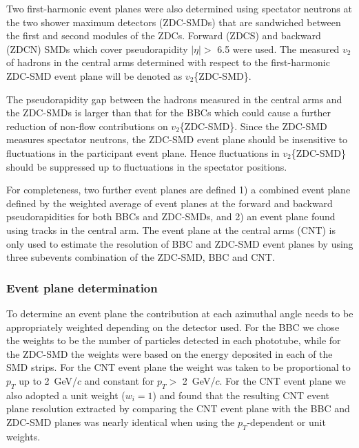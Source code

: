 \documentclass[aps,prc,superscriptaddress,showpacs,floatfix,twocolumn]{revtex4}
\newcommand \gevc{GeV/$c$\xspace}
\newcommand \pt{\mbox{$p_T$}\xspace}
\begin{document}
Two first-harmonic event planes were also determined using spectator neutrons at the two shower maximum 
detectors (ZDC-SMDs) that are sandwiched between the first and second modules of the ZDCs. Forward 
(ZDCS) and backward (ZDCN) SMDs which cover pseudorapidity $|\eta| > $ 6.5 were used. The measured 
$v_2$ of hadrons in the central arms determined with respect to the first-harmonic ZDC-SMD event plane 
will be denoted as $v_2$\{ZDC-SMD\}.

The pseudorapidity gap between the hadrons measured in the central arms and the ZDC-SMDs is larger 
than that for the BBCs which could cause a further reduction of non-flow contributions on $v_2$\{ZDC-SMD\}. 
Since the ZDC-SMD measures spectator neutrons, the ZDC-SMD event plane should be insensitive to 
fluctuations in the participant event plane. Hence fluctuations in $v_2$\{ZDC-SMD\} should be suppressed 
up to fluctuations in the spectator positions.

For completeness, two further event planes are defined 1) a combined event plane defined by the weighted 
average of event planes at the forward and backward pseudorapidities for both BBCs and ZDC-SMDs, and 2) 
an event plane found using tracks in the central arm. The event plane at the central arms (CNT) is only 
used to estimate the resolution of BBC and ZDC-SMD event planes by using three subevents combination 
of the ZDC-SMD, BBC and CNT.

\subsubsection{Event plane determination}
\label{subsubsec:eventplane_determination}

To determine an event plane the contribution at each azimuthal angle needs to be appropriately weighted 
depending on the detector used. For the BBC we chose the weights to be the number of particles detected 
in each phototube, while for the ZDC-SMD the weights were based on the energy deposited in each of the 
SMD strips. For the CNT event plane the weight was taken to be proportional to \pt up to 2~\gevc and constant 
for \pt $>$ 2~\gevc. For the CNT event plane we also adopted a unit weight ($w_i = 1$)  and found that the 
resulting CNT event plane resolution extracted by comparing the CNT event plane with the BBC and ZDC-SMD 
planes was nearly identical when using the $\pt$-dependent or unit weights.
\end{document}
